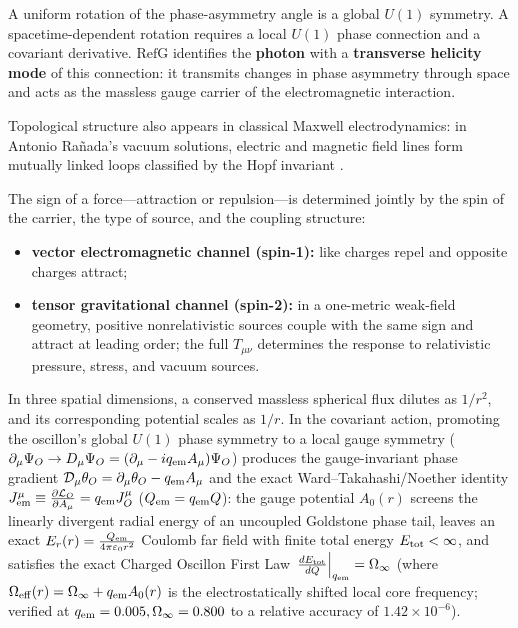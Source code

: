 \documentclass[11pt,a4paper]{article}
\newcommand{\RefG}{\mathrm{RefG}}
\begin{document}
A uniform rotation of the phase-asymmetry angle is a global $U(1)$ symmetry. A spacetime-dependent rotation requires a local $U(1)$ phase connection and a covariant derivative. $\RefG$ identifies the \textbf{photon} with a \textbf{transverse helicity mode} of this connection: it transmits changes in phase asymmetry through space and acts as the massless gauge carrier of the electromagnetic interaction.

Topological structure also appears in classical Maxwell electrodynamics: in Antonio Rañada's vacuum solutions, electric and magnetic field lines form mutually linked loops classified by the Hopf invariant \citep{ranada1989}.

The sign of a force---attraction or repulsion---is determined jointly by the spin of the carrier, the type of source, and the coupling structure:
\begin{itemize}
\item \textbf{vector electromagnetic channel (spin-1):} like charges repel and opposite charges attract;
\item \textbf{tensor gravitational channel (spin-2):} in a one-metric weak-field geometry, positive nonrelativistic sources couple with the same sign and attract at leading order; the full $T_{\mu\nu}$ determines the response to relativistic pressure, stress, and vacuum sources.
\end{itemize}

In three spatial dimensions, a conserved massless spherical flux dilutes as $1/r^2$, and its corresponding potential scales as $1/r$. In the covariant action, promoting the oscillon's global $U(1)$ phase symmetry to a local gauge symmetry ($\partial_\mu\Psi_O \to D_\mu\Psi_O = (\partial_\mu - i q_{\rm em}A_\mu)\Psi_O$) produces the gauge-invariant phase gradient $\mathcal{D}_\mu\theta_O = \partial_\mu\theta_O - q_{\rm em}A_\mu$ and the exact Ward--Takahashi/Noether identity $J_{\rm em}^\mu \equiv \frac{\partial\mathcal{L}_O}{\partial A_\mu} = q_{\rm em}J_O^\mu$ ($Q_{\rm em} = q_{\rm em}Q$): the gauge potential $A_0(r)$ screens the linearly divergent radial energy of an uncoupled Goldstone phase tail, leaves an exact $E_r(r) = \frac{Q_{\rm em}}{4\pi\varepsilon_0 r^2}$ Coulomb far field with finite total energy $E_{\rm tot} < \infty$, and satisfies the exact Charged Oscillon First Law $\left.\frac{dE_{\rm tot}}{dQ}\right|_{q_{\rm em}} = \Omega_\infty$ (where $\Omega_{\rm eff}(r) = \Omega_\infty + q_{\rm em}A_0(r)$ is the electrostatically shifted local core frequency; verified at $q_{\rm em}=0.005, \Omega_\infty=0.800$ to a relative accuracy of $1.42\times 10^{-6}$).
\end{document}
